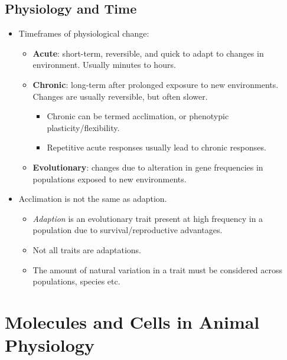 \documentclass[12pt,a4paper]{article}
\begin{document}
\subsection{Physiology and Time}
\begin{itemize}
    \item Timeframes of physiological change:
        \begin{itemize}
            \item \textbf{Acute}: short-term, reversible, and quick to adapt to changes in environment. Usually minutes to hours.
            \item \textbf{Chronic}: long-term after prolonged exposure to new environments. Changes are usually reversible, but often slower. 
                \begin{itemize}
                    \item Chronic can be termed acclimation, or phenotypic plasticity/flexibility.
                     \item Repetitive acute responses usually lead to chronic responses.
                \end{itemize}
            \item \textbf{Evolutionary}: changes due to alteration in gene frequencies in {\color{o-Sun}populations} exposed to new environments.
        \end{itemize}
    \item Acclimation is {\color{false}not the same} as adaption.
        \begin{itemize}
            \item \textit{Adaption} is an evolutionary trait present at high frequency in a population due to survival/reproductive advantages. 
            \item Not all traits are adaptations.
            \item The amount of natural variation in a trait must be considered across populations, species etc.
        \end{itemize}
\end{itemize}

\clearpage
\section{Molecules and Cells in Animal Physiology}
\end{document}
